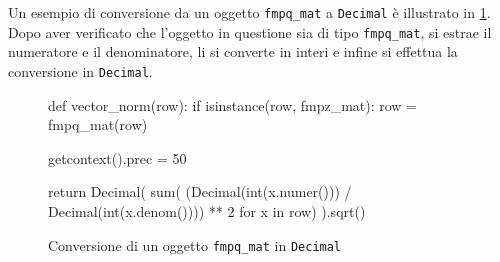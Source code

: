 Un esempio di conversione da un oggetto \texttt{fmpq\_mat} a \texttt{Decimal} è illustrato 
in \ref{fig:conversione}. Dopo aver verificato che l'oggetto in questione sia di tipo  
\texttt{fmpq\_mat}, 
si estrae il numeratore e il denominatore, li si converte in interi e infine si effettua 
la conversione in \texttt{Decimal}. 

\begin{figure}[h]
    \begin{python}
        def vector_norm(row):
            if isinstance(row, fmpz_mat):
                row = fmpq_mat(row)

            getcontext().prec = 50
            
            return Decimal(
                sum(
                    (Decimal(int(x.numer())) / 
                    Decimal(int(x.denom()))) ** 2 
                    for x in row)
                ).sqrt()
    \end{python}
    \caption{Conversione di un oggetto \texttt{fmpq\_mat} in \texttt{Decimal}}
    \label{fig:conversione}
\end{figure}
